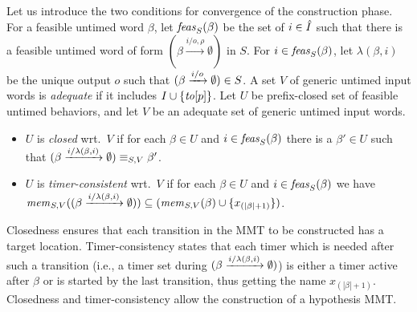 Let us introduce the two conditions for convergence of the construction phase.
For a feasible untimed word $\beta$, let $\feasibleinputs{\beta}{S}$ be the
set of $i \in \extinputs$ such that there is a feasible
untimed word of form $(\beta \xrightarrow{i/o,\rho} \emptyset)$ in $S$.
For $i \in \feasibleinputs{\beta}{S}$, let $\lambda(\beta,i)$ be the unique
output $o$ such that $\extend{\beta}{i}{o} \in S$. 
A set $V$ of generic untimed input words is {\em adequate} if it includes
$I \cup \set{\toevent{p}}$.
Let $U$ be prefix-closed set of feasible untimed behaviors,
and let $V$ be an adequate set of generic untimed input words.
\begin{itemize}
\item
$U$ is {\em closed} wrt.\ $V$ if 
  for each $\beta \in U$ and
  $i \in \feasibleinputs{\beta}{S}$
  there is a $\beta' \in U$ such that
  $\extend{\beta}{i}{\lambda(\beta,i)} \equiv_{S,V} \beta'$.
\item
$U$ is {\em timer-consistent} wrt.\ $V$ if 
  for each $\beta \in U$ and
  $i \in \feasibleinputs{\beta}{S}$
  we have
  $\apprgetmemorable{S}{\extend{\beta}{i}{\lambda(\beta,i)}}{V} \subseteq
  (\apprgetmemorable{S}{\beta}{V} \cup \set{x_{(|\beta|+1)}})$.
\end{itemize}
Closedness ensures that each transition in the MMT to be constructed has a target location. 
Timer-consistency states that each timer which is needed after such
a transition (i.e., a timer set during $\extend{\beta}{i}{\lambda(\beta,i)}$)
is either a timer active after $\beta$ or is started by the last transition, thus
getting the name $x_{(|\beta|+1)}$.
Closedness and timer-consistency allow the construction of a hypothesis MMT.

